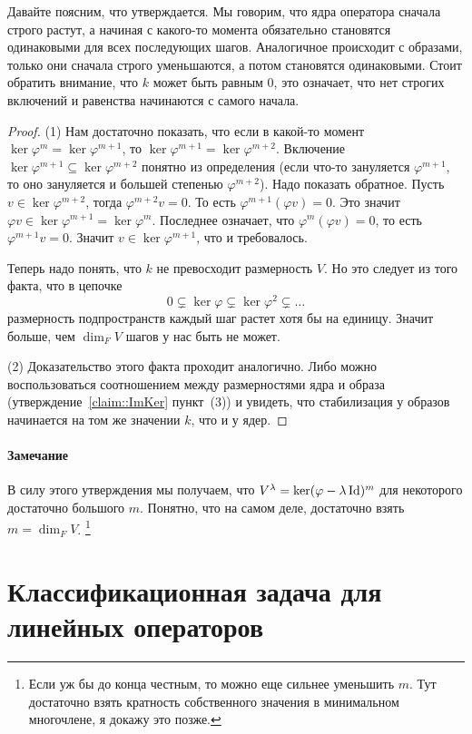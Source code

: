 Давайте поясним, что утверждается.
Мы говорим, что ядра оператора сначала строго растут, а начиная с какого-то момента обязательно становятся одинаковыми для всех последующих шагов.
Аналогичное происходит с образами, только они сначала строго уменьшаются, а потом становятся одинаковыми.
Стоит обратить внимание, что $k$ может быть равным $0$, это означает, что нет строгих включений и равенства начинаются с самого начала.

\begin{proof}

(1) Нам достаточно показать, что если в какой-то момент $\ker \varphi^m = \ker\varphi^{m+1}$, то $\ker \varphi^{m+1} = \ker\varphi^{m+2}$.
Включение $\ker \varphi^{m+1}\subseteq \ker \varphi^{m+2}$ понятно из определения (если что-то зануляется $\varphi^{m+1}$, то оно зануляется и большей степенью $\varphi^{m+2}$).
Надо показать обратное.
Пусть $v\in \ker \varphi^{m+2}$, тогда $\varphi^{m+2}v = 0$.
То есть $\varphi^{m+1}(\varphi v) = 0$.
Это значит $\varphi v \in \ker \varphi^{m+1} = \ker \varphi^m$.
Последнее означает, что $\varphi^m(\varphi v) = 0$, то есть $\varphi^{m+1} v = 0$.
Значит $v\in \ker \varphi^{m+1}$, что и требовалось.

Теперь надо понять, что $k$ не превосходит размерность $V$.
Но это следует из того факта, что в цепочке
\[
0\subsetneq \ker \varphi \subsetneq\ker\varphi^2\subsetneq \ldots
\]
размерность подпространств каждый шаг растет хотя бы на единицу.
Значит больше, чем $\dim_F V$ шагов у нас быть не может.

(2) Доказательство этого факта проходит аналогично.
Либо можно воспользоваться соотношением между размерностями ядра и образа (утверждение~\ref{claim::ImKer} пункт~(3)) и увидеть, что стабилизация у образов начинается на том же значении $k$, что и у ядер.
\end{proof}

\paragraph{Замечание}

В силу этого утверждения мы получаем, что $V^\lambda = \ker (\varphi - \lambda \operatorname{Id})^m$ для некоторого достаточно большого $m$.
Понятно, что на самом деле, достаточно взять $m = \dim_F V$.%
\footnote{Если уж бы до конца честным, то можно еще сильнее уменьшить $m$.
Тут достаточно взять кратность собственного значения в минимальном многочлене, я докажу это позже.}


\newpage
\section{Классификационная задача для линейных операторов}

